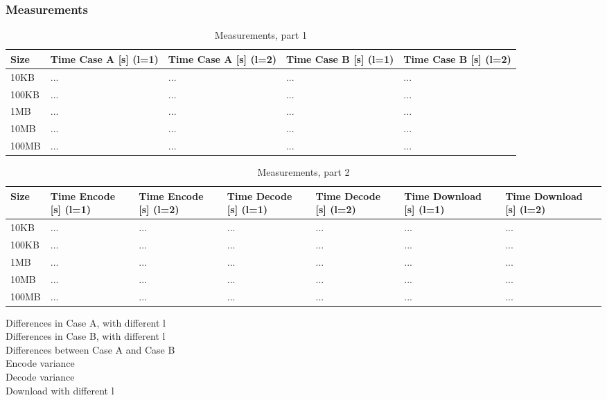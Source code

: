 \subsubsection*{Measurements}
\begin{table}[H]
    \begin{tabularx}{\textwidth}{|X|X|X|X|X|}
        \hline
        \cellcolor{lightgray}\textbf{Size} & \cellcolor{lightgray}\textbf{Time Case A [s] (l=1)} & \cellcolor{lightgray}\textbf{Time Case A [s] (l=2)} & \cellcolor{lightgray}\textbf{Time Case B [s] (l=1)} & \cellcolor{lightgray}\textbf{Time Case B [s] (l=2)} \\\hline
        10KB  & ... & ... & ... & ... \\\hline
        100KB & ... & ... & ... & ... \\\hline
        1MB   & ... & ... & ... & ... \\\hline
        10MB  & ... & ... & ... & ... \\\hline
        100MB & ... & ... & ... & ... \\\hline
    \end{tabularx}
    \caption{Measurements, part 1}
	\label{tab:e3meas1}
\end{table}

\begin{table}[H]
    \begin{tabularx}{\textwidth}{|X|X|X|X|X|X|X|}
        \hline
        \cellcolor{lightgray}\textbf{Size} & \cellcolor{lightgray}\textbf{Time Encode [s] (l=1)} & \cellcolor{lightgray}\textbf{Time Encode [s] (l=2)} & \cellcolor{lightgray}\textbf{Time Decode [s] (l=1)} & \cellcolor{lightgray}\textbf{Time Decode [s] (l=2)} & \cellcolor{lightgray}\textbf{Time Download [s] (l=1)} & \cellcolor{lightgray}\textbf{Time Download [s] (l=2)} \\\hline
        10KB  & ... & ... & ... & ... & ... & ... \\\hline
        100KB & ... & ... & ... & ... & ... & ... \\\hline
        1MB   & ... & ... & ... & ... & ... & ... \\\hline
        10MB  & ... & ... & ... & ... & ... & ... \\\hline
        100MB & ... & ... & ... & ... & ... & ... \\\hline
    \end{tabularx}
    \caption{Measurements, part 2}
	\label{tab:e3meas2}
\end{table}

Differences in Case A, with different l \\
Differences in Case B, with different l \\
Differences between Case A and Case B \\
Encode variance \\
Decode variance \\
Download with different l